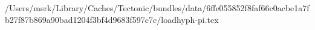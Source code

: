 /Users/msrk/Library/Caches/Tectonic/bundles/data/6ffe055852f8faf66c0acbe1a7fb27f87b869a90bad1204f3bf4d9683f597c7c/loadhyph-pi.tex